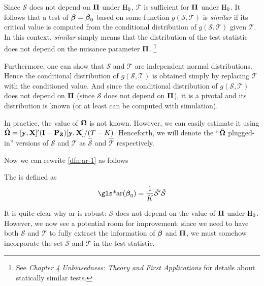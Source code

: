 \documentclass[a4paper]{article}
\begin{document}
\begin{remark}
	Since $\mathcal{S}$ does not depend on $\boldsymbol{\Pi}$ under $\mathrm{H}_0$,
	$\mathcal{T}$ is sufficient for $\boldsymbol{\Pi}$ under $\mathrm{H}_0$.
	It follows that a test of $\boldsymbol{\beta}=\boldsymbol{\beta}_0$ based on some function $g(\mathcal{S},\mathcal{T})$ is \emph{similar}
	if its critical value is computed from the conditional distribution of $g(\mathcal{S},\mathcal{T})$ given $\mathcal{T}$.
	In this context,
	\emph{similar} simply means that the distribution of the test statistic does not depend on the nuisance parameter $\boldsymbol{\Pi}$.
	\footnote{
		See \textcite{lehmann-2022} \emph{Chapter 4 Unbiasedness: Theory and First Applications}
		for details about statically similar tests.
	}
	\parencite{moreira-2009,stock-wright-yogo-2002}
\end{remark}

\begin{remark}
	Furthermore, one can show that $\mathcal{S}$ and $\mathcal{T}$ are independent normal distributions.
	Hence the conditional distribution of $g(\mathcal{S},\mathcal{T})$ is obtained
	simply by replacing $\mathcal{T}$ with the conditioned value.
	And since the conditional distribution of $g(\mathcal{S},\mathcal{T})$ does not depend on $\boldsymbol{\Pi}$
	(since $\mathcal{S}$ does not depend on $\boldsymbol{\Pi}$),
	it is a pivotal and its distribution is known (or at least can be computed with simulation).
	\parencite{moreira-2009,shi-2012}
\end{remark}

\begin{remark}
	In practice, the value of $\boldsymbol{\Omega}$ is not known.
	However, we can easily estimate it using $\hat{\boldsymbol{\Omega}}=[\mathbf{y},\mathbf{X}]'(\mathbf{I}-\mathbf{P}_{\mathbf{Z}})[\mathbf{y},\mathbf{X}]/(T-K)$.
	Henceforth, we will denote the ``$\hat{\boldsymbol{\Omega}}$ plugged-in'' versions of $\mathcal{S}$ and $\mathcal{T}$
	as $\hat{\mathcal{S}}$ and $\hat{\mathcal{T}}$ respectively.
	\parencite{stock-wright-yogo-2002}
\end{remark}

Now we can rewrite \autoref{dfn:ar-1} as follows

\begin{definition}[\glsentrylong{ar}]\label{dfn:ar-2}
	The  is defined as
	\begin{align*}
		\text{\gls*{ar}}(\bbeta_0)
		= \frac1K \hat{\mathcal{S}}\T \hat{\mathcal{S}}
	\end{align*}
\end{definition}

\begin{remark}
	It is quite clear why \gls*{ar} is robust:
	$\mathcal{S}$ does not depend on the value of $\boldsymbol{\Pi}$ under $\mathrm{H}_0$.
	However, we now see a potential room for improvement:
	since we need to have both $\mathcal{S}$ and $\mathcal{T}$ to fully extract the information of $\boldsymbol{\beta}$ and $\boldsymbol{\Pi}$,
	we must somehow incorporate the set $\mathcal{S}$ and $\mathcal{T}$ in the test statistic.
\end{remark}
\end{document}
